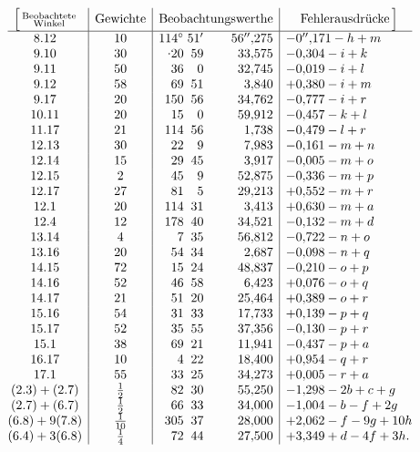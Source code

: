 \[
\begin{array}{@{}c|c|r@{\;}r@{\;}r|l@{}}
 \Bigl[\,\substack{\text{Beobachtete}\\\text{Winkel}}&
 \text{Gewichte}&\multicolumn{3}{c|}{\text{Beobachtungswerthe}}&
 \multicolumn{1}{c@{}}{\text{Fehlerausdrücke}\,\Bigr]}\\
 \hline
 8.12&10&114^\circ&51'&56''{,}275&-0''{,}171-h+m\\
 9.10&30&\mathord{\raisebox{.55ex}{.}}20&59&33{,}575&-0{,}304-i+k\\
 9.11&50&36&0&32{,}745&-0{,}019-i+l\\
 9.12&58&69&51&3{,}840&+0{,}380-i+m\\
 9.17&20&150&56&34{,}762&-0{,}777-i+r\\
 10.11&20&15&0&59{,}912&-0{,}457-k+l\\
 11.17&21&114&56&1{,}738&-0{,}479-l+r\\
 12.13&30&22&9&7{,}983&-0{,}161-m+n\\
 12.14&15&29&45&3{,}917&-0{,}005-m+o\\
 12.15&2&45&9&52{,}875&-0{,}336-m+p\\
 12.17&27&81&5&29{,}213&+0{,}552-m+r\\
 12.1&20&114&31&3{,}413&+0{,}630-m+a\\
 12.4&12&178&40&34{,}521&-0{,}132-m+d\\
 13.14&4&7&35&56{,}812&-0{,}722-n+o\\
 13.16&20&54&34&2{,}687&-0{,}098-n+q\\
 14.15&72&15&24&48{,}837&-0{,}210-o+p\\
 14.16&52&46&58&6{,}423&+0{,}076-o+q\\
 14.17&21&51&20&25{,}464&+0{,}389-o+r\\
 15.16&54&31&33&17{,}733&+0{,}139-p+q\\
 15.17&52&35&55&37{,}356&-0{,}130-p+r\\
 15.1&38&69&21&11{,}941&-0{,}437-p+a\\
 16.17&10&4&22&18{,}400&+0{,}954-q+r\\
 17.1&55&33&25&34{,}273&+0{,}005-r+a\\
 (2.3)+(2.7)&\frac12&82&30&55{,}250&-1{,}298-2b+c+g\\
 (2.7)+(6.7)&\frac12&66&33&34{,}000&-1{,}004-b-f+2g\\
 (6.8)+9(7.8)&\frac{1}{10}&305&37&28{,}000&+2{,}062-f-9g+10h\\
 (6.4)+3(6.8)&\frac14&72&44&27{,}500&+3{,}349+d-4f+3h.
\end{array}
\]

